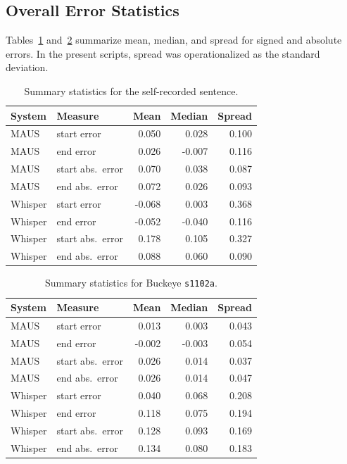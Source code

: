 \documentclass[11pt]{article}
\begin{document}
\subsection{Overall Error Statistics}
Tables~\ref{tab:sentence_stats} and~\ref{tab:buckeye_stats} summarize mean, median, and spread for signed and absolute errors. In the present scripts, spread was operationalized as the standard deviation.

\begin{table}[H]
\centering
\small
\begin{tabular}{llrrr}
\toprule
System & Measure & Mean & Median & Spread \\
\midrule
MAUS & start error & 0.050 & 0.028 & 0.100 \\
MAUS & end error & 0.026 & -0.007 & 0.116 \\
MAUS & start abs.\ error & 0.070 & 0.038 & 0.087 \\
MAUS & end abs.\ error & 0.072 & 0.026 & 0.093 \\
Whisper & start error & -0.068 & 0.003 & 0.368 \\
Whisper & end error & -0.052 & -0.040 & 0.116 \\
Whisper & start abs.\ error & 0.178 & 0.105 & 0.327 \\
Whisper & end abs.\ error & 0.088 & 0.060 & 0.090 \\
\bottomrule
\end{tabular}
\caption{Summary statistics for the self-recorded sentence.}
\label{tab:sentence_stats}
\end{table}

\begin{table}[H]
\centering
\small
\begin{tabular}{llrrr}
\toprule
System & Measure & Mean & Median & Spread \\
\midrule
MAUS & start error & 0.013 & 0.003 & 0.043 \\
MAUS & end error & -0.002 & -0.003 & 0.054 \\
MAUS & start abs.\ error & 0.026 & 0.014 & 0.037 \\
MAUS & end abs.\ error & 0.026 & 0.014 & 0.047 \\
Whisper & start error & 0.040 & 0.068 & 0.208 \\
Whisper & end error & 0.118 & 0.075 & 0.194 \\
Whisper & start abs.\ error & 0.128 & 0.093 & 0.169 \\
Whisper & end abs.\ error & 0.134 & 0.080 & 0.183 \\
\bottomrule
\end{tabular}
\caption{Summary statistics for Buckeye \texttt{s1102a}.}
\label{tab:buckeye_stats}
\end{table}
\end{document}

